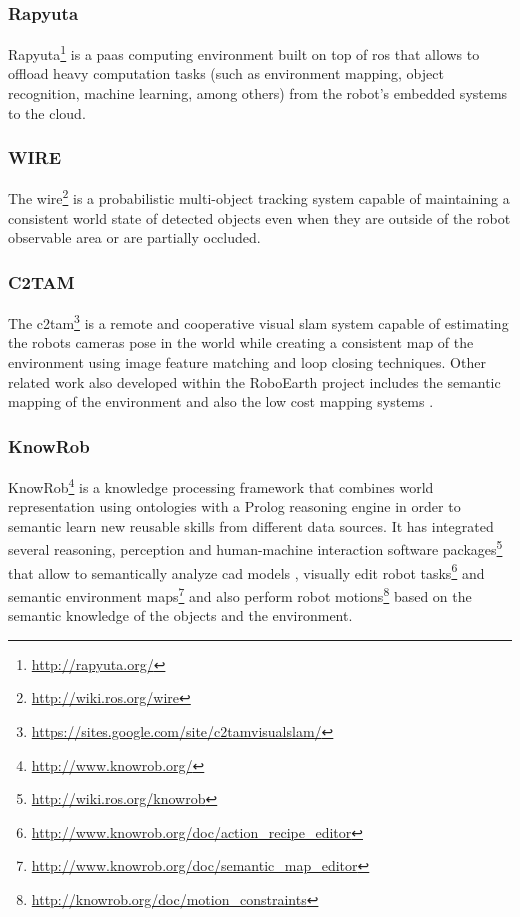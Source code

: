 \subsubsection{Rapyuta}

Rapyuta\footnote{\url{http://rapyuta.org/}} \cite{Hunziker2013} is a \gls{paas} computing environment built on top of \gls{ros} that allows to offload heavy computation tasks (such as environment mapping, object recognition, machine learning, among others) from the robot's embedded systems to the cloud.


\subsubsection{WIRE}

The \gls{wire}\footnote{\url{http://wiki.ros.org/wire}} \cite{Elfring2013} is a probabilistic multi-object tracking system capable of maintaining a consistent world state of detected objects even when they are outside of the robot observable area or are partially occluded.


\subsubsection{C2TAM}

The \gls{c2tam}\footnote{\url{https://sites.google.com/site/c2tamvisualslam/}} \cite{Riazuelo2014} is a remote and cooperative visual \gls{slam} system capable of estimating the robots cameras pose in the world while creating a consistent map of the environment using image feature matching and loop closing techniques. Other related work also developed within the RoboEarth project includes the semantic mapping of the environment \cite{Riazuelo2015} and also the low cost mapping systems \cite{Mohanarajah2015}.


\subsubsection{KnowRob}

KnowRob\footnote{\url{http://www.knowrob.org/}} \cite{Tenorth2013k} is a knowledge processing framework that combines world representation using ontologies with a Prolog reasoning engine in order to semantic learn new reusable skills from different data sources. It has integrated several reasoning, perception and human-machine interaction software packages\footnote{\url{http://wiki.ros.org/knowrob}} that allow to semantically analyze \gls{cad} models \cite{Tenorth2013cad}, visually edit robot tasks\footnote{\url{http://www.knowrob.org/doc/action_recipe_editor}} and semantic environment maps\footnote{\url{http://www.knowrob.org/doc/semantic_map_editor}} \cite{Pangercic2012} and also perform robot motions\footnote{\url{http://knowrob.org/doc/motion_constraints}} \cite{tenorth14motiontemplates} based on the semantic knowledge of the objects and the environment.


